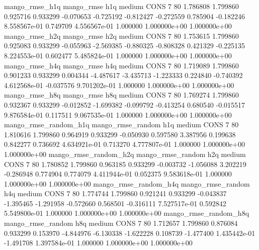        mango_rmse_h1q        mango_rmse                  h1q     medium     CONS                 7 80  1.786808       1.799860 0.925716       0.933299   -0.070653     -0.725192     -0.812427    -0.272559       0.785904 -0.182246 8.558567e-01     0.749709   4.556567e-01            1.000000    1.000000e+00        1.000000e+00
       mango_rmse_h2q        mango_rmse                  h2q     medium     CONS                 7 80  1.753615       1.799860 0.925083       0.933299   -0.055963     -2.569385     -0.880325    -0.808328       0.421329 -0.225135 8.224553e-01     0.602477   5.485824e-01            1.000000    1.000000e+00        1.000000e+00
       mango_rmse_h4q        mango_rmse                  h4q     medium     CONS                 7 80  1.719089       1.799860 0.901233       0.933299    0.004344     -4.487617     -3.435713    -1.223333       0.224840 -0.740392 4.612568e-01    -0.037576   9.701202e-01            1.000000    1.000000e+00        1.000000e+00
       mango_rmse_h8q        mango_rmse                  h8q     medium     CONS                 7 80  1.769274       1.799860 0.932367       0.933299   -0.012852     -1.699382     -0.099792    -0.413254       0.680540 -0.015517 9.876584e-01     0.117511   9.067535e-01            1.000000    1.000000e+00        1.000000e+00
mango_rmse_random_h1q mango_rmse_random                  h1q     medium     CONS                 7 80  1.810616       1.799860 0.964919       0.933299   -0.050930      0.597580      3.387956     0.199638       0.842277  0.736692 4.634921e-01     0.713270   4.777807e-01            1.000000    1.000000e+00        1.000000e+00
mango_rmse_random_h2q mango_rmse_random                  h2q     medium     CONS                 7 80  1.780852       1.799860 0.963185       0.933299   -0.003732     -1.056088      3.202219    -0.286948       0.774904  0.774079 4.411944e-01     0.052375   9.583618e-01            1.000000    1.000000e+00        1.000000e+00
mango_rmse_random_h4q mango_rmse_random                  h4q     medium     CONS                 7 80  1.774744       1.799860 0.921241       0.933299   -0.043837     -1.395465     -1.291958    -0.572660       0.568501 -0.316111 7.527517e-01     0.592842   5.549800e-01            1.000000    1.000000e+00        1.000000e+00
mango_rmse_random_h8q mango_rmse_random                  h8q     medium     CONS                 7 80  1.712657       1.799860 0.876084       0.933299    0.153970     -4.844976     -6.130338    -1.622228       0.108739 -1.477400 1.435442e-01    -1.491708   1.397584e-01            1.000000    1.000000e+00        1.000000e+00
